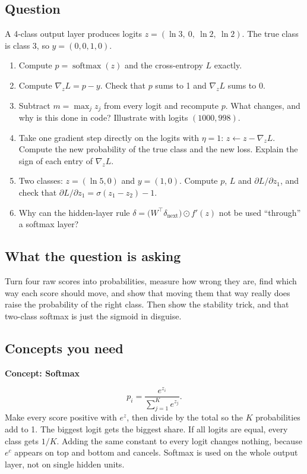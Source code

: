 \documentclass[12pt,a4paper]{article}
\newcommand{\concept}[2]{\par\medskip\phantomsection\label{#1}{\large\bfseries\color{blue!50!black} Concept: #2}\par}
\newcommand{\hlq}[1]{{\setlength{\fboxsep}{1.5pt}\colorbox{yellow}{#1}}}
\begin{document}
\subsection*{Question}
A 4-class output layer produces logits $z=(\ln3,\ 0,\ \ln2,\ \ln2)$. The true class is class 3, so $y=(0,0,1,0)$.
\begin{enumerate}[label=(\alph*)]
\item[\hlq{(a)}] Compute $p=\operatorname{softmax}(z)$ and the cross-entropy $L$ exactly.
\item[\hlq{(b)}] Compute $\nabla_zL=p-y$. Check that $p$ sums to 1 and $\nabla_zL$ sums to 0.
\item[\hlq{(c)}] Subtract $m=\max_j z_j$ from every logit and recompute $p$. What changes, and why is this done in code? Illustrate with logits $(1000, 998)$.
\item[(d)] Take one gradient step directly on the logits with $\eta=1$: $z\leftarrow z-\nabla_zL$. Compute the new probability of the true class and the new loss. Explain the sign of each entry of $\nabla_zL$.
\item[\hlq{(e)}] Two classes: $z=(\ln5,0)$ and $y=(1,0)$. Compute $p$, $L$ and $\partial L/\partial z_1$, and check that $\partial L/\partial z_1=\sigma(z_1-z_2)-1$.
\item[\hlq{(f)}] Why can the hidden-layer rule $\delta=\bigl(W^\top\delta_{\text{next}}\bigr)\odot f'(z)$ not be used ``through'' a softmax layer?
\end{enumerate}

\subsection*{What the question is asking}
Turn four raw scores into probabilities, measure how wrong they are, find which way each score should move, and show that moving them that way really does raise the probability of the right class. Then show the stability trick, and that two-class softmax is just the sigmoid in disguise.

\subsection*{Concepts you need}

\concept{c:softmax}{Softmax}
\[
p_i=\frac{e^{z_i}}{\sum_{j=1}^Ke^{z_j}} .
\]
Make every score positive with $e^{z}$, then divide by the total so the $K$ probabilities add to 1. The biggest logit gets the biggest share. If all logits are equal, every class gets $1/K$. Adding the same constant to every logit changes nothing, because $e^{c}$ appears on top and bottom and cancels. Softmax is used on the whole output layer, not on single hidden units.
\end{document}
